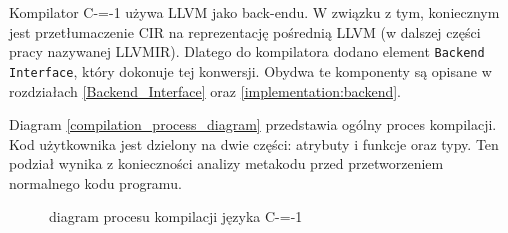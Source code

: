 Kompilator C-=-1 używa LLVM jako back-endu. W związku z tym, koniecznym jest przetłumaczenie CIR na reprezentację pośrednią LLVM (w dalszej części pracy nazywanej LLVMIR). Dlatego do kompilatora dodano element \lstinline{Backend Interface}, który dokonuje tej konwersji. Obydwa te komponenty są opisane w rozdziałach \ref{Backend_Interface} oraz \ref{implementation:backend}.

Diagram \ref{compilation_process_diagram} przedstawia ogólny proces kompilacji.
Kod użytkownika jest dzielony na dwie części: atrybuty i funkcje oraz typy.
Ten podział wynika z konieczności analizy metakodu przed przetworzeniem normalnego kodu programu.


\begin{figure}[]
    \caption{diagram procesu kompilacji języka C-=-1}

\end{figure}
